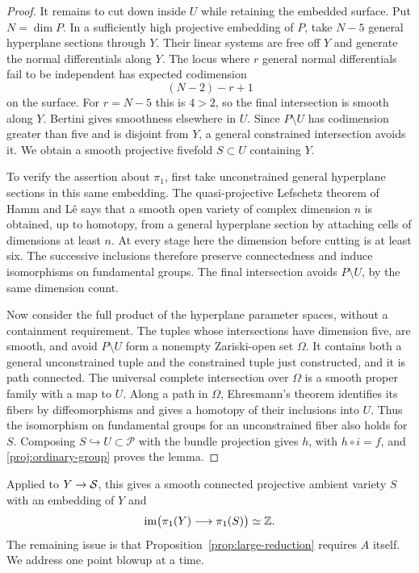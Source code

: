 \begin{proof}
It remains to cut down inside $U$ while retaining the embedded surface.
Put $N=\dim P$.  In a sufficiently high projective embedding of $P$,
take $N-5$ general hyperplane sections through $Y$.  Their linear systems
are free off $Y$ and generate the normal differentials along $Y$.
The locus where $r$ general normal differentials fail to be independent
has expected codimension
\begin{equation}\label{proj:rank-loss}
 (N-2)-r+1
\end{equation}
on the surface.  For $r=N-5$ this is $4>2$, so the final intersection
is smooth along $Y$.  Bertini gives smoothness elsewhere in $U$.
Since $P\setminus U$ has codimension greater than five and is disjoint
from $Y$, a general constrained intersection avoids it.  We obtain a
smooth projective fivefold $S\subset U$ containing $Y$.

To verify the assertion about $\pi_1$, first take unconstrained general
hyperplane sections in this same embedding.  The quasi-projective
Lefschetz theorem of Hamm and L\^e
\cite[Theorem~1.1.3(ii)]{HammLe} says that a smooth open variety of
complex dimension $n$ is obtained, up to homotopy, from a general
hyperplane section by attaching cells of dimensions at least $n$.
At every stage here the dimension before cutting is at least six.
The successive inclusions therefore preserve connectedness and induce
isomorphisms on fundamental groups.  The final intersection avoids
$P\setminus U$, by the same dimension count.

Now consider the full product of the hyperplane parameter spaces,
without a containment requirement.  The tuples whose intersections
have dimension five, are smooth, and avoid $P\setminus U$ form a
nonempty Zariski-open set $\Omega$.  It contains both a general
unconstrained tuple and the constrained tuple just constructed, and it
is path connected.  The universal complete intersection over $\Omega$
is a smooth proper family with a map to $U$.  Along a path in $\Omega$,
Ehresmann's theorem identifies its fibers by diffeomorphisms and gives
a homotopy of their inclusions into $U$.  Thus the isomorphism on
fundamental groups for an unconstrained fiber also holds for $S$.
Composing $S\hookrightarrow U\subset\mathcal P$ with the bundle
projection gives $h$, with $h\circ i=f$, and
\eqref{proj:ordinary-group} proves the lemma.
\end{proof}

Applied to $Y\to\mathcal S$, this gives a smooth connected projective ambient
variety $S$ with an embedding of $Y$ and
\begin{equation}\label{proj:blownup-image}
 \operatorname{im}\bigl(\pi_1(Y)\longrightarrow\pi_1(S)\bigr)\simeq\mathbb Z.
\end{equation}
The remaining issue is that Proposition~\ref{prop:large-reduction}
requires $A$ itself.  We address one point blowup at a time.


